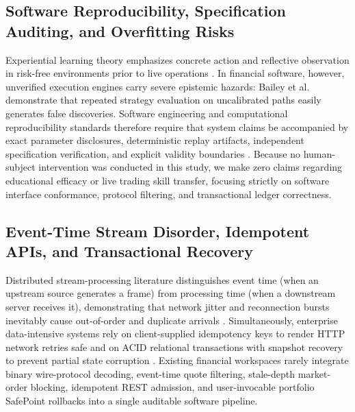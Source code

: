 \documentclass[12pt]{article}
\begin{document}
\subsection{Software Reproducibility, Specification Auditing, and Overfitting Risks}
Experiential learning theory emphasizes concrete action and reflective observation in risk-free environments prior to live operations \cite{kolb1984}. In financial software, however, unverified execution engines carry severe epistemic hazards: Bailey et al.\ \cite{bailey2014} demonstrate that repeated strategy evaluation on uncalibrated paths easily generates false discoveries. Software engineering and computational reproducibility standards therefore require that system claims be accompanied by exact parameter disclosures, deterministic replay artifacts, independent specification verification, and explicit validity boundaries \cite{peng2011,wohlin2012}. Because no human-subject intervention was conducted in this study, we make zero claims regarding educational efficacy or live trading skill transfer, focusing strictly on software interface conformance, protocol filtering, and transactional ledger correctness.

\subsection{Event-Time Stream Disorder, Idempotent APIs, and Transactional Recovery}
Distributed stream-processing literature distinguishes event time (when an upstream source generates a frame) from processing time (when a downstream server receives it), demonstrating that network jitter and reconnection bursts inevitably cause out-of-order and duplicate arrivals \cite{akidau2015,lamport1978,hasbrouck2013}. Simultaneously, enterprise data-intensive systems rely on client-supplied idempotency keys to render HTTP network retries safe \cite{helland2012} and on ACID relational transactions with snapshot recovery to prevent partial state corruption \cite{gray1993,kleppmann2017,fowler2002}. Existing financial workspaces rarely integrate binary wire-protocol decoding, event-time quote filtering, stale-depth market-order blocking, idempotent REST admission, and user-invocable portfolio SafePoint rollbacks into a single auditable software pipeline.
\end{document}
